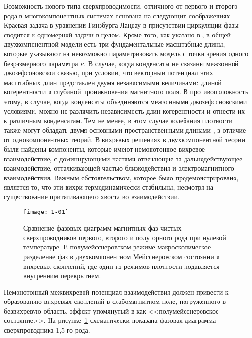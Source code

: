 Возможность нового типа сверхпроводимости, отличного от первого и второго рода 
в многокомпонентных системах \cite{bib:1,bib:2} основана на следующих 
соображениях. Краевая задача в уравнении Гинзбурга-Ландау в присутствии 
циркуляции фазы сводится к одномерной задачи в целом. Кроме того, как указано в 
\cite{bib:1,bib:2}, в общей двухкомпонентной модели есть три фундаментальные 
масштабные длины, которые указывают на невозможно параметризовать модель с 
точки зрения одного безразмерного параметра \( \kappa \). В случае, когда 
конденсаты не связаны межзонной джозефсоновской связью, при условии, что 
векторный потенциал этих масштабных длин представлен двумя независимыми 
величинами: длиной когерентности и глубиной проникновения магнитного поля. В 
противоположность этому, в случае, когда конденсаты объединяются межзонными 
джозефсоновскими условиями, можно не различить независимость длин когерентности 
и отнести их к различным конденсатам. Тем не менее, в этом случае колебания 
плотности также могут обладать двумя основными пространственными длинами
\cite{bib:2}, в отличие от однокомпонентных теорий. В \cite{bib:1,bib:2} 
вихревых решениях в двухкомпонентной теории были найдены компоненты, которые 
имеют немонотонное вихревое взаимодействие, с доминирующими частями отвечающие 
за дальнодействующее взаимодействие, отталкивающей частью близкодействия и 
электромагнитного взаимодействия. Важным обстоятельством, которое было 
продемонстрировано, является то, что эти вихри термодинамически стабильны, 
несмотря на существование притягивающего хвоста во взаимодействии.

\begin{figure}[h!]
    \center
    \texttt{[image: 1-01]}
    \caption{Сравнение фазовых диаграмм магнитных фаз чистых сверхпроводников
        первого, второго и полуторного рода при нулевой температуре. В 
        полумейсснеровском режиме макроскопическое разделение фаз в 
        двухкомпонентном Мейсснеровском состоянии и вихревых скоплений, где 
        один из режимов плотности подавляется внутренним перекрытием.}
    \label{fig:1}
\end{figure}

Немонотонный межвихревой потенциал взаимодействия должен привести к 
образованию вихревых скоплений в слабомагнитном поле, погруженного в 
безвихревую область, эффект упомянутый в \cite{bib:1} как 
<<полумейсснеровское состояние>>. На рисунке~\ref{fig:1} схематически 
показана фазовая диаграмма сверхпроводника 1,5-го рода.

